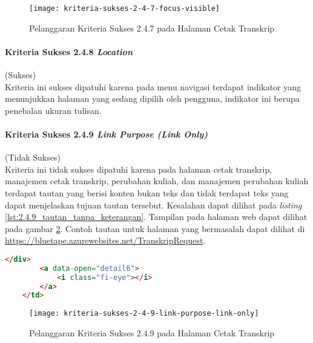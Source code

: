 \begin{figure}[H]
    \centering  
    \texttt{[image: kriteria-sukses-2-4-7-focus-visible]}  
    \caption[Pelanggaran Kriteria Sukses 2.4.7 pada Halaman Cetak Transkrip]{Pelanggaran Kriteria Sukses 2.4.7 pada Halaman Cetak Transkrip}
    \label{fig:2.4.7_focus_visible}  
\end{figure}

\paragraph{Kriteria Sukses 2.4.8 \textit{Location}}
\label{par:kepatuhan_bluetape_kriteria_sukses_2.4.8}
(Sukses)\\

Kriteria ini sukses dipatuhi karena pada menu navigasi terdapat indikator yang menunjukkan halaman yang sedang dipilih oleh pengguna, indikator ini berupa penebalan ukuran tulisan.

\paragraph{Kriteria Sukses 2.4.9 \textit{Link Purpose (Link Only)}}
\label{par:kepatuhan_bluetape_kriteria_sukses_2.4.9}
(Tidak Sukses)\\

Kriteria ini tidak sukses dipatuhi karena pada halaman cetak transkrip, manajemen cetak transkrip, perubahan kuliah, dan manajemen perubahan kuliah terdapat tautan yang berisi konten bukan teks dan tidak terdapat teks yang dapat menjelaskan tujuan tautan tersebut. Kesalahan dapat dilihat pada \textit{listing} \ref{lst:2.4.9_tautan_tanpa_keterangan}. Tampilan pada halaman web dapat dilihat pada gambar \ref{fig:2.4.9_link_purpose_link_only}. Contoh tautan untuk halaman yang bermasalah dapat dilihat di \url{https://bluetape.azurewebsites.net/TranskripRequest}.

\begin{lstlisting}[frame=single, label={lst:2.4.9_tautan_tanpa_keterangan}, language=HTML, caption=Pelanggaran Kriteria Sukses 2.4.9 pada Halaman Cetak Transkrip]
        </div>
        <a data-open="detail6">
            <i class="fi-eye"></i>
        </a>
    </td>
\end{lstlisting}

\begin{figure}[H]
    \centering  
    \texttt{[image: kriteria-sukses-2-4-9-link-purpose-link-only]}  
    \caption[Pelanggaran Kriteria Sukses 2.4.9 pada Halaman Cetak Transkrip]{Pelanggaran Kriteria Sukses 2.4.9 pada Halaman Cetak Transkrip}
    \label{fig:2.4.9_link_purpose_link_only}  
\end{figure} 

